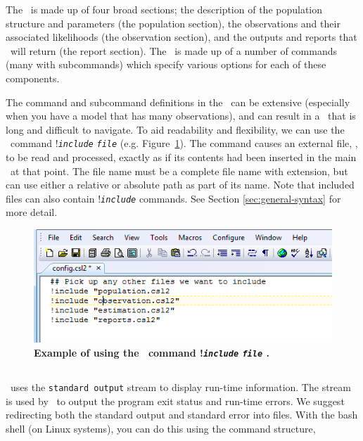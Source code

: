 The \config\ is made up of four broad sections; the description of the population structure and parameters (the population section), the observations and their associated likelihoods (the observation section), and the outputs and reports that \IBM\ will return (the report section). The \config\ is made up of a number of commands (many with subcommands) which specify various options for each of these components.

The command and subcommand definitions in the \config\ can be extensive (especially when you have a model that has many observations), and can result in a \config\ that is long and difficult to navigate. To aid readability and flexibility, we can use the \config\ command !\texttt{\emph{include}} \texttt{\emph{file}}  (e.g. Figure~\ref{fig:config_file_1}). The command causes an external file, , to be read and processed, exactly as if its contents had been inserted in the main \config\ at that point. The file name must be a complete file name with extension, but can use either a relative or absolute path as part of its name. Note that included files can also contain !\texttt{\emph{include}} commands. See Section \ref{sec:general-syntax} for more detail.


\vspace*{3mm}
\begin{figure}[htp]
	\includegraphics[scale=1]{Figures/config.png}
	\caption{\textbf{Example of using the \config\ command !\texttt{\emph{include}}
			\texttt{\emph{file}} .}}\label{fig:config_file_1}
\end{figure}

\subsection{\label{sec:redirecting-stdout}}

\IBM\ uses the \texttt{standard output} stream to display run-time information. The  stream is used by \IBM\ to output the program exit status and run-time errors. We suggest redirecting both the standard output and standard error into files. With the bash shell (on Linux systems), you can do this using the command structure,

